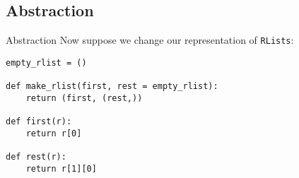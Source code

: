 \documentclass[9pt]{beamer}
\begin{document}
\subsection{Abstraction}
\begin{frame}[fragile]{Abstraction}
  Now suppose we change our representation of {\tt RLists}:
  \begin{lstlisting}
empty_rlist = ()

def make_rlist(first, rest = empty_rlist):
    return (first, (rest,))

def first(r):
    return r[0]

def rest(r):
    return r[1][0]
  \end{lstlisting}

\end{frame}
\end{document}
